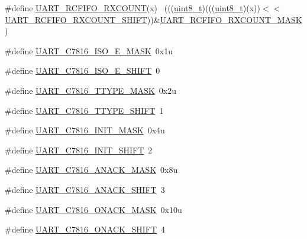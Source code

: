 \begin{DoxyCompactItemize}
\#define \hyperlink{group___u_a_r_t___register___masks_gaabce88d9705d1c57459758cdb6a93c71}{U\+A\+R\+T\+\_\+\+R\+C\+F\+I\+F\+O\+\_\+\+R\+X\+C\+O\+U\+NT}(x)                                  ~(((\hyperlink{_p_e___types_8h_aba7bc1797add20fe3efdf37ced1182c5}{uint8\+\_\+t})(((\hyperlink{_p_e___types_8h_aba7bc1797add20fe3efdf37ced1182c5}{uint8\+\_\+t})(x))$<$$<$\hyperlink{group___u_a_r_t___register___masks_gaf167fbdec63bf8287e0c1fa12ad7f39f}{U\+A\+R\+T\+\_\+\+R\+C\+F\+I\+F\+O\+\_\+\+R\+X\+C\+O\+U\+N\+T\+\_\+\+S\+H\+I\+FT}))\&\hyperlink{group___u_a_r_t___register___masks_gad56c1815bb877b0a82dcabc58b780b54}{U\+A\+R\+T\+\_\+\+R\+C\+F\+I\+F\+O\+\_\+\+R\+X\+C\+O\+U\+N\+T\+\_\+\+M\+A\+SK})
\item 
\#define \hyperlink{group___u_a_r_t___register___masks_gae34238a46464deaac39303c8b11431a2}{U\+A\+R\+T\+\_\+\+C7816\+\_\+\+I\+S\+O\+\_\+E\+\_\+\+M\+A\+SK}~0x1u
\item 
\#define \hyperlink{group___u_a_r_t___register___masks_gaee54546d1f78919cbcae5b7a5ec44f17}{U\+A\+R\+T\+\_\+\+C7816\+\_\+\+I\+S\+O\+\_\+E\+\_\+\+S\+H\+I\+FT}~0
\item 
\#define \hyperlink{group___u_a_r_t___register___masks_ga5c2601e69d81abd9d74da1eedefe0073}{U\+A\+R\+T\+\_\+\+C7816\+\_\+\+T\+T\+Y\+P\+E\+\_\+\+M\+A\+SK}~0x2u
\item 
\#define \hyperlink{group___u_a_r_t___register___masks_ga53eb4e563ed15c4c1e73d1fd15a77b2e}{U\+A\+R\+T\+\_\+\+C7816\+\_\+\+T\+T\+Y\+P\+E\+\_\+\+S\+H\+I\+FT}~1
\item 
\#define \hyperlink{group___u_a_r_t___register___masks_ga52afeea9fbaec9489c45792a907b195b}{U\+A\+R\+T\+\_\+\+C7816\+\_\+\+I\+N\+I\+T\+\_\+\+M\+A\+SK}~0x4u
\item 
\#define \hyperlink{group___u_a_r_t___register___masks_ga7fe58f80db753fac78feefc4ab257d0d}{U\+A\+R\+T\+\_\+\+C7816\+\_\+\+I\+N\+I\+T\+\_\+\+S\+H\+I\+FT}~2
\item 
\#define \hyperlink{group___u_a_r_t___register___masks_ga7d492736d5d2ffba794d54fa0d6b8d92}{U\+A\+R\+T\+\_\+\+C7816\+\_\+\+A\+N\+A\+C\+K\+\_\+\+M\+A\+SK}~0x8u
\item 
\#define \hyperlink{group___u_a_r_t___register___masks_gae5c391d165239e4ed2d80e7ac31a0232}{U\+A\+R\+T\+\_\+\+C7816\+\_\+\+A\+N\+A\+C\+K\+\_\+\+S\+H\+I\+FT}~3
\item 
\#define \hyperlink{group___u_a_r_t___register___masks_ga031dcabb12ed66e1a74a735e962c0418}{U\+A\+R\+T\+\_\+\+C7816\+\_\+\+O\+N\+A\+C\+K\+\_\+\+M\+A\+SK}~0x10u
\item 
\#define \hyperlink{group___u_a_r_t___register___masks_ga969b1c4c1e85e7745b73b993b93b4c6f}{U\+A\+R\+T\+\_\+\+C7816\+\_\+\+O\+N\+A\+C\+K\+\_\+\+S\+H\+I\+FT}~4
$$
\end{DoxyCompactItemize}
